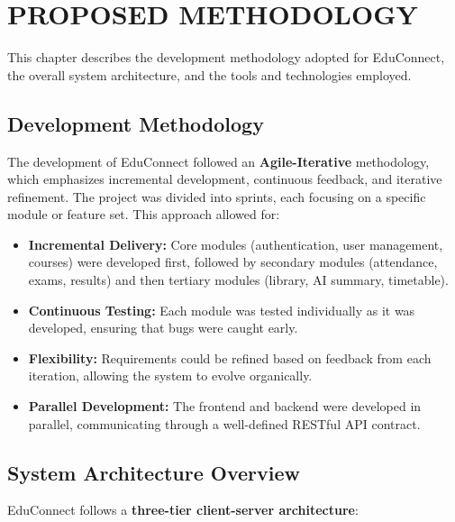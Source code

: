 \newpage 
\section{PROPOSED METHODOLOGY}
\hline

This chapter describes the development methodology adopted for EduConnect, the overall system architecture, and the tools and technologies employed.

\subsection{Development Methodology}

The development of EduConnect followed an \textbf{Agile-Iterative} methodology, which emphasizes incremental development, continuous feedback, and iterative refinement. The project was divided into sprints, each focusing on a specific module or feature set. This approach allowed for:

\begin{itemize}[leftmargin=2em]
    \item \textbf{Incremental Delivery:} Core modules (authentication, user management, courses) were developed first, followed by secondary modules (attendance, exams, results) and then tertiary modules (library, AI summary, timetable).
    
    \item \textbf{Continuous Testing:} Each module was tested individually as it was developed, ensuring that bugs were caught early.
    
    \item \textbf{Flexibility:} Requirements could be refined based on feedback from each iteration, allowing the system to evolve organically.
    
    \item \textbf{Parallel Development:} The frontend and backend were developed in parallel, communicating through a well-defined RESTful API contract.
\end{itemize}

\subsection{System Architecture Overview}

EduConnect follows a \textbf{three-tier client-server architecture}:

